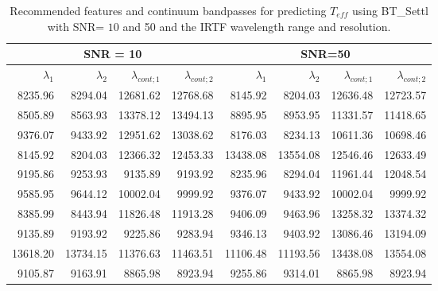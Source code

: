 \begin{table}
\begin{center}

  \begin{tabular}{rrrr | rrrr}
  \hline
 \multicolumn{4}{c}{SNR = 10} &  \multicolumn{4}{c}{SNR=50} \\
  \hline
$\lambda_1$ & $\lambda_2$ & $\lambda_{cont;1}$ & $\lambda_{cont;2} $ & $\lambda_1$ & $\lambda_2$ & $\lambda_{cont;1}$ & $\lambda_{cont;2} $ \\ 
  \hline
8235.96  & 8294.04   & 12681.62 & 12768.68   &  8145.92 & 8204.03   & 12636.48 & 12723.57 \\   
8505.89  & 8563.93   & 13378.12 & 13494.13   &  8895.95 & 8953.95   & 11331.57 & 11418.65 \\     
9376.07  & 9433.92   & 12951.62 & 13038.62   &  8176.03 & 8234.13   & 10611.36 & 10698.46 \\      
8145.92  & 8204.03   & 12366.32 & 12453.33   &  13438.08 & 13554.08 & 12546.46 & 12633.49 \\     
9195.86  & 9253.93   & 9135.89 & 9193.92     &  8235.96 & 8294.04   & 11961.44 & 12048.54 \\      
9585.95  & 9644.12   & 10002.04 & 9999.92    &  9376.07 & 9433.92   & 10002.04 & 9999.92  \\   
8385.99  & 8443.94   & 11826.48 & 11913.28   &  9406.09 & 9463.96   & 13258.32 & 13374.32 \\    
9135.89  & 9193.92   & 9225.86 & 9283.94     &  9346.13 & 9403.92   & 13086.46 & 13194.09 \\   
13618.20 & 13734.15  & 11376.63 & 11463.51   &  11106.48 & 11193.56 & 13438.08 & 13554.08 \\    
9105.87  & 9163.91   & 8865.98 & 8923.94     &  9255.86 & 9314.01   & 8865.98  & 8923.94  \\    
\hline
\end{tabular}
\caption {Recommended features and continuum bandpasses for predicting
  $ T_{eff} $ using BT\_Settl with SNR= $ 10 $ and 50 and the IRTF
  wavelength range and resolution.} \label{tab:irtf-teff-noisy}
\end{center}
\end{table}

